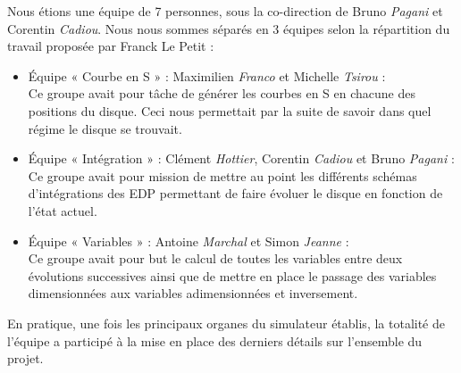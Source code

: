 Nous étions une équipe de 7 personnes, sous la co-direction de Bruno \textit{Pagani} et Corentin \textit{Cadiou}. Nous nous sommes séparés en 3 équipes selon la répartition du travail proposée par Franck Le Petit :
\begin{itemize}
    \item Équipe « Courbe en S » : Maximilien \textit{Franco} et Michelle \textit{Tsirou} :
    \\Ce groupe avait pour tâche de générer les courbes en S en chacune des positions du disque. Ceci nous permettait par la suite de savoir dans quel régime le disque se trouvait.
    \item Équipe « Intégration » : Clément \textit{Hottier}, Corentin \textit{Cadiou} et Bruno \textit{Pagani} :
    \\Ce groupe avait pour mission de mettre au point les différents schémas d'intégrations des EDP permettant de faire évoluer le disque en fonction de l'état actuel.
    \item Équipe « Variables » : Antoine \textit{Marchal} et Simon \textit{Jeanne} :
    \\Ce groupe avait pour but le calcul de toutes les variables entre deux évolutions successives ainsi que de mettre en place le passage des variables dimensionnées aux variables adimensionnées et inversement.
\end{itemize}
En pratique, une fois les principaux organes du simulateur établis, la totalité de l'équipe a participé à la mise en place des derniers détails sur l'ensemble du projet. 


